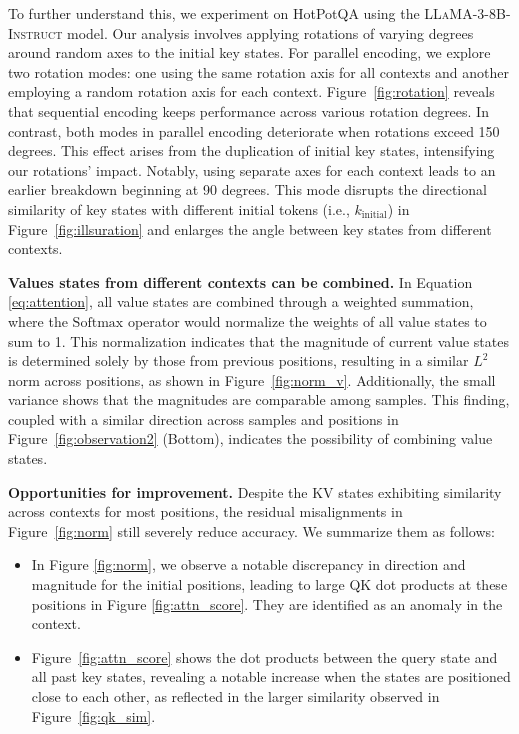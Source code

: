 

To further understand this, we experiment on HotPotQA using the \textsc{LLaMA-3-8B-Instruct} model. Our analysis involves applying rotations of varying degrees around random axes to the initial key states. For parallel encoding, we explore two rotation modes: one using the same rotation axis for all contexts and another employing a random rotation axis for each context. Figure~\ref{fig:rotation} reveals that sequential encoding keeps performance across various rotation degrees. In contrast, both modes in parallel encoding deteriorate when rotations exceed 150 degrees. This effect arises from the duplication of initial key states, intensifying our rotations' impact. Notably, using separate axes for each context leads to an earlier breakdown beginning at 90 degrees. This mode disrupts the directional similarity of key states with different initial tokens (i.e., $k_{\text{initial}}$) in Figure~\ref{fig:illsuration} and enlarges the angle between key states from different contexts.

\textbf{Values states from different contexts can be combined.} In Equation \eqref{eq:attention}, all value states are combined through a weighted summation, where the $\mathrm{Softmax}$ operator would normalize the weights of all value states to sum to 1. This normalization indicates that the magnitude of current value states is determined solely by those from previous positions, resulting in a similar $L^2$ norm across positions, as shown in Figure~\ref{fig:norm_v}. Additionally, the small variance shows that the magnitudes are comparable among samples. This finding, coupled with a similar direction across samples and positions in Figure~\ref{fig:observation2} (Bottom), indicates the possibility of combining value states.

\textbf{Opportunities for improvement.} Despite the KV states exhibiting similarity across contexts for most positions, the residual misalignments in Figure~\ref{fig:norm} still severely reduce accuracy. We summarize them as follows:
\begin{itemize}
[itemsep=0.0pt,topsep=0pt,leftmargin=*]
\item In Figure \ref{fig:norm}, we observe a notable discrepancy in direction and magnitude for the initial positions, leading to large QK dot products at these positions in Figure \ref{fig:attn_score}. They are identified as an anomaly in the context.
\item Figure~\ref{fig:attn_score} shows the dot products between the query state and all past key states, revealing a notable increase when the states are positioned close to each other, as reflected in the larger similarity observed in Figure~\ref{fig:qk_sim}.
\end{itemize}
